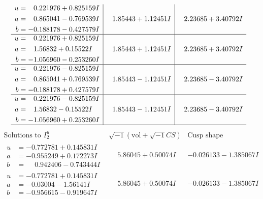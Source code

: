 \documentclass[1p]{elsarticle_modified}
\theoremstyle{definition}
\newcommand{\I}{\sqrt{-1}}
\begin{document}
$$\begin{array}{c|c|c}
\begin{aligned}
u &= \phantom{-}0.221976 + 0.825159 I \\
a &= \phantom{-}0.865041 - 0.769539 I \\
b &= -0.188178 - 0.427579 I\end{aligned}
 & \phantom{-}1.85443 + 1.12451 I & \phantom{-}2.23685 + 3.40792 I \\ \hline\begin{aligned}
u &= \phantom{-}0.221976 + 0.825159 I \\
a &= \phantom{-}1.56832 + 0.15522 I \\
b &= -1.056960 - 0.253260 I\end{aligned}
 & \phantom{-}1.85443 + 1.12451 I & \phantom{-}2.23685 + 3.40792 I \\ \hline\begin{aligned}
u &= \phantom{-}0.221976 - 0.825159 I \\
a &= \phantom{-}0.865041 + 0.769539 I \\
b &= -0.188178 + 0.427579 I\end{aligned}
 & \phantom{-}1.85443 - 1.12451 I & \phantom{-}2.23685 - 3.40792 I \\ \hline\begin{aligned}
u &= \phantom{-}0.221976 - 0.825159 I \\
a &= \phantom{-}1.56832 - 0.15522 I \\
b &= -1.056960 + 0.253260 I\end{aligned}
 & \phantom{-}1.85443 - 1.12451 I & \phantom{-}2.23685 - 3.40792 I\\
 \hline 
 \end{array}$$\newpage$$\begin{array}{c|c|c}  
\text{Solutions to }I^u_{2}& \I (\text{vol} + \sqrt{-1}CS) & \text{Cusp shape}\\
 \hline 
\begin{aligned}
u &= -0.772781 + 0.145831 I \\
a &= -0.955249 + 0.172273 I \\
b &= \phantom{-}0.942406 - 0.743444 I\end{aligned}
 & \phantom{-}5.86045 + 0.50074 I & -0.026133 - 1.385067 I \\ \hline\begin{aligned}
u &= -0.772781 + 0.145831 I \\
a &= -0.03004 - 1.56141 I \\
b &= -0.956615 - 0.919647 I\end{aligned}
 & \phantom{-}5.86045 + 0.50074 I & -0.026133 - 1.385067 I \\ \hline\begin{aligned}

\end{aligned}
\end{array}$$
\end{document}
